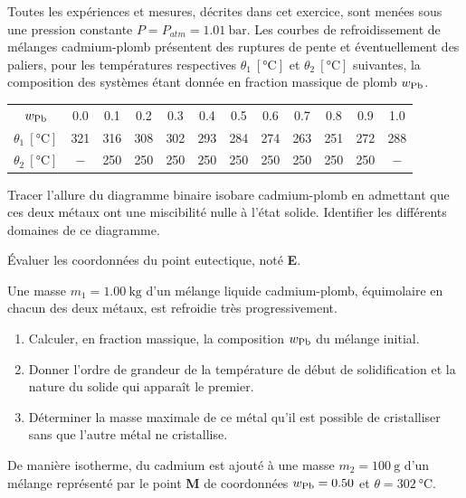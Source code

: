 

\setcounter{equation}{0}
\setcounter{Q}{0}

Toutes les expériences et mesures, décrites dans cet exercice, sont menées sous une pression constante $P = P_{atm} = 1.01 ~ \si{\bar}$. Les courbes de refroidissement de mélanges cadmium-plomb présentent des ruptures de pente et éventuellement des paliers, pour les températures respectives $\theta_1 ~ [\si{\celsius}]$ et $\theta_2 ~ [\si{\celsius}]$ suivantes, la composition des systèmes étant donnée en fraction massique de plomb $w_{\ce{Pb}}$.

\begin{center}
\begin{tabular}{cccccccccccc}
$w_{\ce{Pb}}$ & 0.0 & 0.1 & 0.2 & 0.3 & 0.4 & 0.5 & 0.6 & 0.7 & 0.8 & 0.9 & 1.0 \\
$\theta_1 ~ [\si{\celsius}]$ & 321 & 316 & 308 & 302 & 293 & 284 & 274 & 263 & 251 & 272 & 288 \\
$\theta_2 ~ [\si{\celsius}]$ & $-$ & 250 & 250 & 250 & 250 & 250 & 250 & 250 & 250 & 250 & $-$ \\
\end{tabular}
\end{center}


\Q Tracer l'allure du diagramme binaire isobare cadmium-plomb en admettant que ces deux métaux ont une miscibilité nulle à l'état solide. Identifier les différents domaines de ce diagramme.

\Q Évaluer les coordonnées du point eutectique, noté \textbf{E}.

\Q Une masse $m_1 = 1.00 ~ \si{\kilo\gram}$ d'un mélange liquide cadmium-plomb, équimolaire en chacun des deux métaux, est refroidie très progressivement.

\begin{enumerate}
\item Calculer, en fraction massique, la composition $w_{\ce{Pb}}$ du mélange initial.

\item Donner l'ordre de grandeur de la température de début de solidification et la nature du solide qui apparaît le premier.

\item Déterminer la masse maximale de ce métal qu'il est possible de cristalliser sans que l'autre métal ne cristallise.
\end{enumerate}

\Q De manière isotherme, du cadmium est ajouté à une masse $m_2 = 100 ~ \si{\gram}$ d'un mélange représenté par le point \textbf{M} de coordonnées $w_{\ce{Pb}} = 0.50$ et $\theta = 302 ~ \si{\celsius}$.

